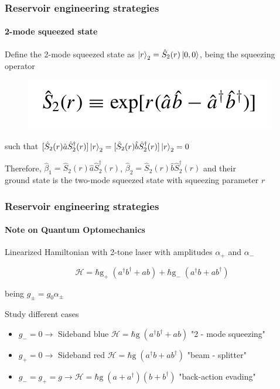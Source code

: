 \documentclass[aspectratio=43]{beamer}
\begin{document}
\begin{frame}
	
	\frametitle{Reservoir engineering strategies}
	\framesubtitle{2-mode squeezed state}
	
	Define the {\color{blue}2-mode squeezed state} as $\ket{r}_{2} = \hat{S}_{2}(r) \ket{0,0}$, being the squeezing operator
	\begin{figure}
		\includegraphics[width = 4.5 cm]{plots/2_squeezed_mode.png}
	\end{figure}	

	such that $[\hat{S}_{2}(r) \hat{a} \hat{S}_{2}^{\dagger}(r)]\ket{r}_{2} = [\hat{S}_{2}(r) \hat{b} \hat{S}_{2}^{\dagger}(r)]\ket{r}_{2} = 0$\\
	
	\vspace{0.5cm}
	
	Therefore, $\hat{\beta}_{1} = \hat{S}_{2}(r) \hat{a} \hat{S}_{2}^{\dagger}(r)$, $\hat{\beta}_{2} = \hat{S}_{2}(r) \hat{b} \hat{S}_{2}^{\dagger}(r)$ and their\\ground state is the two-mode squeezed state with squeezing parameter $r$

\end{frame}

\begin{frame}
	
	\frametitle{Reservoir engineering strategies}
	\framesubtitle{Note on Quantum Optomechanics}
	
	Linearized Hamiltonian with 2-tone laser with amplitudes $\alpha_{+}$ and $\alpha_{-}$
	
	\begin{equation}
	\mathcal{H} = \hbar \textrm{g}_{+} \; (a^{\dagger}b^{\dagger} + ab) + \hbar \textrm{g}_{-} \; (a^{\dagger}b + ab^{\dagger}) \nonumber
	\end{equation}
	
	being $g_{\pm} = g_{0} \alpha_{\pm}$\\

	\vspace{0.5 cm}
	
	Study different cases
	
	\begin{itemize}
		\item $g_{-} = 0 \longrightarrow$ Sideband blue $\mathcal{H} = \hbar \textrm{g} \; (a^{\dagger}b^{\dagger} + ab)$ "2 - mode squeezing"
		\item $g_{+} = 0 \longrightarrow$ Sideband red $\mathcal{H} = \hbar \textrm{g} \; (a^{\dagger}b + ab^{\dagger})$ {\color{blue}"beam - splitter"}
		\item $g_{-} = g_{+} = g \longrightarrow \mathcal{H} = \hbar \textrm{g} \; (a + a^{\dagger})(b + b^{\dagger})$ "back-action evading"
	\end{itemize}	

\end{frame}
\end{document}
